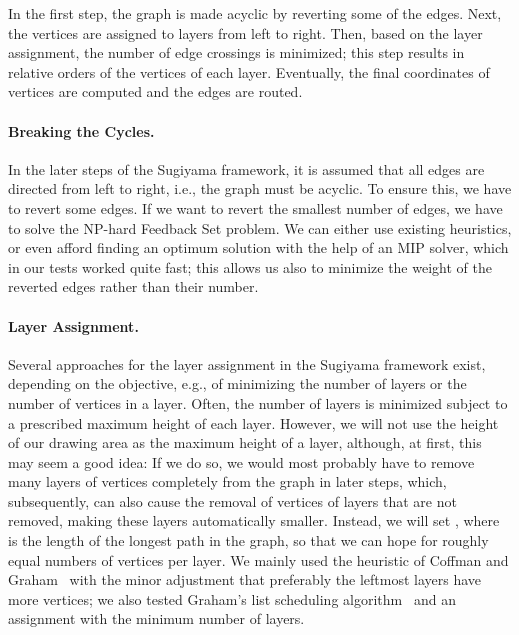 \documentclass[]{llncs}
\begin{document}
In the first step, the graph is made acyclic by reverting some of the
edges. Next, the vertices are assigned to layers from left to right.
Then, based on the layer assignment, the number of edge crossings is
minimized; this step results in relative
orders of the vertices of each layer. Eventually, the final
coordinates of vertices are computed and the edges are routed.

\paragraph{Breaking the Cycles.}
In the later steps of the Sugiyama framework, it is assumed
that all edges are directed from left to right, i.e., the graph must
be acyclic. To ensure this, we
have to revert some edges. If we want to  revert the smallest number
of edges, we have to solve the NP-hard Feedback Set problem. We can either
use existing heuristics, or even afford finding an
optimum solution with the help of an MIP solver, which in our tests
worked quite fast; this allows us also to minimize the weight of the
reverted edges rather than their number.

\paragraph{Layer Assignment.}
Several approaches for the layer assignment in the Sugiyama framework
exist, depending on the objective, e.g., of minimizing the number of
layers or the number of vertices in a layer. Often,
the number of layers is minimized subject to a prescribed maximum
height of each layer. However, we will not
use the height of our drawing area as the maximum height of a layer,
although, at first, this may seem a good idea: If we do so, we would
most probably have to remove many layers of vertices completely from
the graph in later steps, which, subsequently, can also cause the
removal of vertices of layers that are not removed, making these
layers automatically smaller. Instead, we will set , where  is the length of the longest path in the graph, so
that we can hope for roughly equal numbers of vertices per layer.
We mainly used the heuristic of Coffman and
Graham~\cite{coffman1972optimal} with the minor adjustment that
preferably the leftmost layers have more vertices; we also tested
Graham's list scheduling algorithm~\cite{6767827} and an assignment with the
minimum number of layers.
\end{document}

